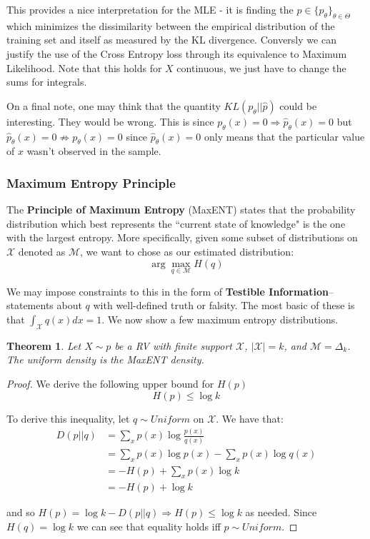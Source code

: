 \documentclass[]{article}
\theoremstyle{mattstyle}
\newtheorem{theorem}{Theorem}[section]
\theoremstyle{definition}
\begin{document}
This provides a nice interpretation for the MLE - it is finding the $p\in \{p_{\theta}\}_{\theta\in\Theta}$ which minimizes the dissimilarity between the empirical distribution of the training set and itself as measured by the KL divergence. Conversly we can justify the use of the Cross Entropy loss through its equivalence to Maximum Likelihood. Note that this holds for $X$ continuous, we just have to change the sums for integrals.

On a final note, one may think that the quantity $KL(p_{\theta}|| \hat{p})$ could be interesting. They would be wrong. This is since $p_{\theta}(x)=0 \Rightarrow \hat{p}_{\theta}(x)=0$ but $\hat{p}_{\theta}(x)=0 \not\Rightarrow p_{\theta}(x)=0$ since $\hat{p}_{\theta}(x)=0$ only means that the particular value of $x$ wasn't observed in the sample.	


\subsubsection{Maximum Entropy Principle}

The \textbf{Principle of Maximum Entropy} (MaxENT) states that the probability distribution which best represents the ``current state of knowledge" is the one with the largest entropy. More specifically, given some subset of distributions on $\mathcal{X}$ denoted as $\mathcal{M}$, we want to chose as our estimated distribution:
$$\arg\max\limits_{q \in \mathcal{M}} H(q)$$

We may impose constraints to this in the form of \textbf{Testible Information}-- statements about $q$ with well-defined truth or falsity. The most basic of these is that $\int_{\mathcal{X}}^{} q(x)dx = 1$. We now show a few maximum entropy distributions. 

\newpage

\begin{theorem}\label{th:unifentlim}
	Let $X\sim p$ be a RV with finite support $\mathcal{X}$, $|\mathcal{X}|=k$, and $\mathcal{M} = \Delta_{k}$. The uniform density is the MaxENT density.
\end{theorem}

\begin{proof}
	We derive the following upper bound for \(H(p)\)
	\begin{equation}
	H(p) \le \log k
	\end{equation}
	
	To derive this inequality, let \(q\sim Uniform\) on $\mathcal{X}$. We have that:
	\begin{align*}
	D(p||q)&=\sum_{x}p(x)\log\frac{p(x)}{q(x)}\\
	&=\sum_{x}p(x)\log p(x)-\sum_xp(x)\log q(x)\\
	&= -H(p) + \sum_xp(x)\log k \\
	&= -H(p) + \log k
	\end{align*}
	
	and so \(H(p)=\log k-D(p||q) \Rightarrow H(p) \le \log k \) as needed. Since $H(q) = \log k$ we can see that equality holds iff $p \sim Uniform$.
\end{proof}
\end{document}

